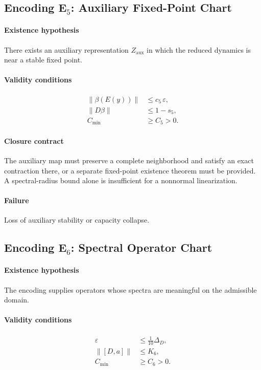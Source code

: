 \documentclass[11pt]{article}
\theoremstyle{plain}
\theoremstyle{plain}
\begin{document}
\subsection{Encoding \texorpdfstring{E$_5$}{E5}: Auxiliary Fixed-Point Chart}

\paragraph{Existence hypothesis}
There exists an auxiliary representation $Z_{\mathrm{aux}}$
in which the reduced dynamics is near a stable fixed point.

\paragraph{Validity conditions}
\begin{align}
\|\beta(E(y))\| &\le c_5\,\varepsilon, \\
\|D\beta\| &\le 1 - s_5, \\
C_{\min} &\ge C_5 > 0.
\end{align}

\paragraph{Closure contract}
The auxiliary map must preserve a complete neighborhood and satisfy an exact
contraction there, or a separate fixed-point existence theorem must be
provided.  A spectral-radius bound alone is insufficient for a nonnormal
linearization.

\paragraph{Failure}
Loss of auxiliary stability or capacity collapse.


\subsection{Encoding \texorpdfstring{E$_6$}{E6}: Spectral Operator Chart}

\paragraph{Existence hypothesis}
The encoding supplies operators whose spectra are meaningful
on the admissible domain.

\paragraph{Validity conditions}
\begin{align}
\varepsilon &\le \tfrac{1}{10}\Delta_D, \\
\|[D,a]\| &\le K_6, \\
C_{\min} &\ge C_6 > 0.
\end{align}
\end{document}
